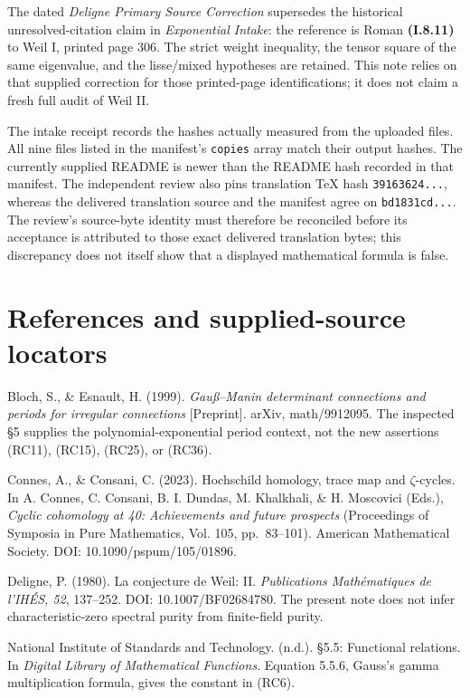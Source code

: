 \documentclass[
  11pt,
]{article}
\begin{document}
The dated \emph{Deligne Primary Source Correction} supersedes the
historical unresolved-citation claim in \emph{Exponential Intake}: the
reference is Roman \textbf{(I.8.11)} to Weil I, printed page 306. The
strict weight inequality, the tensor square of the same eigenvalue, and
the lisse/mixed hypotheses are retained. This note relies on that
supplied correction for those printed-page identifications; it does not
claim a fresh full audit of Weil II.

The intake receipt records the hashes actually measured from the
uploaded files. All nine files listed in the manifest's \texttt{copies}
array match their output hashes. The currently supplied README is newer
than the README hash recorded in that manifest. The independent review
also pins translation TeX hash \texttt{39163624...}, whereas the
delivered translation source and the manifest agree on
\texttt{bd1831cd...}. The review's source-byte identity must therefore
be reconciled before its acceptance is attributed to those exact
delivered translation bytes; this discrepancy does not itself show that
a displayed mathematical formula is false.

\section{References and supplied-source
locators}\label{references-and-supplied-source-locators}

Bloch, S., \& Esnault, H. (1999). \emph{Gauß--Manin determinant
connections and periods for irregular connections} {[}Preprint{]}.
arXiv, math/9912095. The inspected §5 supplies the
polynomial-exponential period context, not the new assertions (RC11),
(RC15), (RC25), or (RC36).

Connes, A., \& Consani, C. (2023). Hochschild homology, trace map and
\(\zeta\)-cycles. In A. Connes, C. Consani, B. I. Dundas, M. Khalkhali,
\& H. Moscovici (Eds.), \emph{Cyclic cohomology at 40: Achievements and
future prospects} (Proceedings of Symposia in Pure Mathematics, Vol.
105, pp.~83--101). American Mathematical Society. DOI:
10.1090/pspum/105/01896.

Deligne, P. (1980). La conjecture de Weil: II. \emph{Publications
Mathématiques de l'IHÉS, 52}, 137--252. DOI: 10.1007/BF02684780. The
present note does not infer characteristic-zero spectral purity from
finite-field purity.

National Institute of Standards and Technology. (n.d.). §5.5: Functional
relations. In \emph{Digital Library of Mathematical Functions}. Equation
5.5.6, Gauss's gamma multiplication formula, gives the constant in
(RC6).
\end{document}
